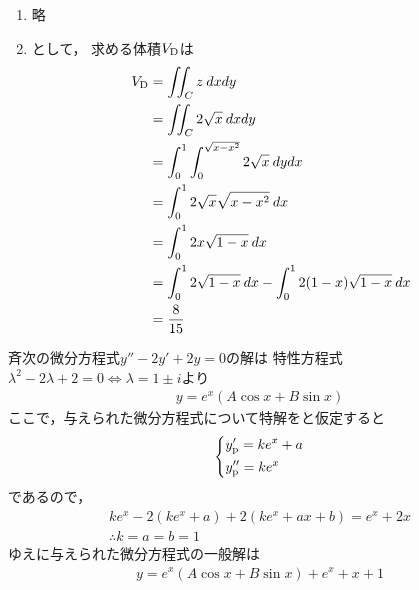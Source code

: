 \begin{ans*} %
  \begin{enumerate}[label=(\arabic*)]
    \item 略
    \item {}として，
    求める体積$V_{\rm{D}}$は
    \begin{align}
      V_{\rm{D}}
      &= \iint_C z\:dxdy \\
      &= \iint_C 2\sqrt{x}\:dxdy \\
      &= \int_{0}^{1}\int_{0}^{\sqrt{x-x^2}} 2\sqrt{x}\:dydx \\
      &= \int_{0}^{1}2\sqrt{x}\sqrt{x-x^2}\:dx \\
      &= \int_{0}^{1} 2x\sqrt{1-x}\:dx \\
      &= \int_{0}^{1} 2\sqrt{1-x}\:dx - \int_{0}^{1}2(1-x)\sqrt{1-x}\:dx \\
      &= \frac{8}{15}
    \end{align}
  \end{enumerate}
  
\end{ans*}

\begin{ans*}
  斉次の微分方程式$y'' - 2y' + 2y = 0$の解は
  特性方程式$\lambda^2 - 2\lambda + 2 = 0\Longleftrightarrow \lambda = 1\pm i$より
  \begin{gather}
    y = e^x (A\cos x + B\sin x)
  \end{gather}
  ここで，与えられた微分方程式について特解をと仮定すると
  \begin{gather}
    \begin{dcases*}
      y'_{\rm{p}} = ke^x + a \\
      y''_{\rm{p}} = ke^x
    \end{dcases*}
  \end{gather}
  であるので，
  \begin{gather}
    ke^x - 2(ke^x + a) + 2(ke^x + ax + b) = e^x + 2x \\
    \therefore k = a = b = 1
  \end{gather}
  ゆえに与えられた微分方程式の一般解は
  \begin{gather}
    y = e^x(A\cos x + B\sin x) + e^x + x + 1
  \end{gather}
\end{ans*}


